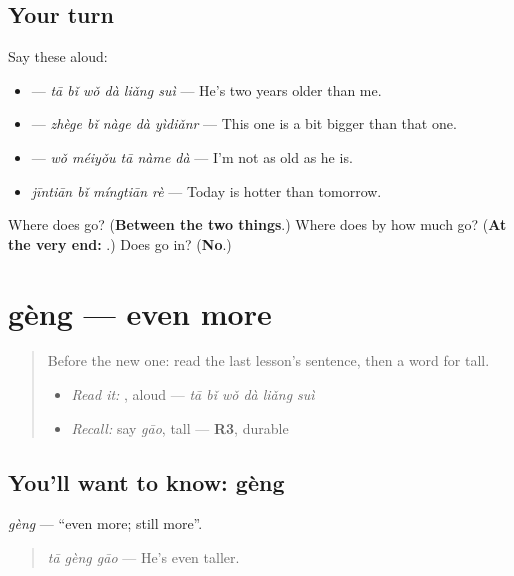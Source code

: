 \subsection*{Your turn}
Say these aloud:

\begin{itemize}
\raggedright
  \item {} — \emph{tā bǐ wǒ dà liǎng suì} — He's two years older than me.
  \item {} — \emph{zhège bǐ nàge dà yìdiǎnr} — This one is a bit bigger than that one.
  \item {} — \emph{wǒ méiyǒu tā nàme dà} — I'm not as old as he is.
  \item \emph{jīntiān bǐ míngtiān rè} — Today is hotter than tomorrow.
\end{itemize}

\begin{tcolorbox}[breakable,colback=teal!4,colframe=teal!35!black,title={Before you move on}]
Where does  go? (\textbf{Between the two things}.) Where does by how much go? (\textbf{At the very end: }.) Does  go in? (\textbf{No}.)
\end{tcolorbox}
\section[gèng]{gèng — even more}

\label{lesson:ZH-C153-geng}



\begin{quote}
Before the new one: read the last lesson's sentence, then a word for tall.

\begin{itemize}
\raggedright
  \item \emph{Read it:} , aloud — \emph{tā bǐ wǒ dà liǎng suì}
  \item \emph{Recall:} say \emph{gāo}, tall — \textbf{R3}, durable
\end{itemize}
\end{quote}

\subsection*{You'll want to know: gèng}
\emph{gèng} — \textquotedblleft{}even more; still more\textquotedblright{}.

\begin{quote}
\emph{tā gèng gāo} — He's even taller.
\end{quote}

